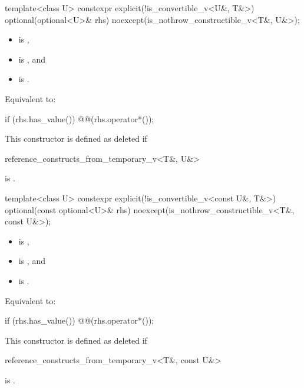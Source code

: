 \begin{itemdecl}
template<class U>
  constexpr explicit(!is_convertible_v<U&, T&>)
  optional(optional<U>& rhs) noexcept(is_nothrow_constructible_v<T&, U&>);
\end{itemdecl}

\begin{itemdescr}
\pnum
\constraints
\begin{itemize}
\item {} is ,
\item {} is , and
\item {} is .
\end{itemize}

\pnum
\effects
Equivalent to:
\begin{codeblock}
if (rhs.has_value()) @@(rhs.operator*());
\end{codeblock}

\pnum
\remarks
This constructor is defined as deleted if
\begin{codeblock}
reference_constructs_from_temporary_v<T&, U&>
\end{codeblock}
is .
\end{itemdescr}

\begin{itemdecl}
template<class U>
  constexpr explicit(!is_convertible_v<const U&, T&>)
  optional(const optional<U>& rhs) noexcept(is_nothrow_constructible_v<T&, const U&>);
\end{itemdecl}

\begin{itemdescr}
\pnum
\constraints
\begin{itemize}
\item {} is ,
\item {} is , and
\item {} is .
\end{itemize}

\pnum
\effects
Equivalent to:
\begin{codeblock}
if (rhs.has_value()) @@(rhs.operator*());
\end{codeblock}

\pnum
\remarks
This constructor is defined as deleted if
\begin{codeblock}
reference_constructs_from_temporary_v<T&, const U&>
\end{codeblock}
is .
\end{itemdescr}

